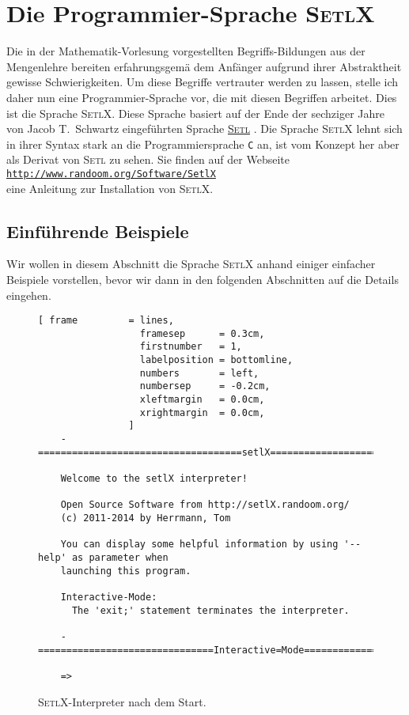 \chapter{Die Programmier-Sprache \textsc{SetlX}}
Die in der Mathematik-Vorlesung vorgestellten Begriffs-Bildungen aus der Mengenlehre bereiten
erfahrungsgem\"{a}\3 dem Anf\"{a}nger aufgrund ihrer Abstraktheit gewisse Schwierigkeiten.  Um
diese Begriffe vertrauter werden zu lassen, stelle ich daher nun eine Programmier-Sprache
vor, die mit diesen Begriffen arbeitet.  Dies ist die Sprache \textsc{SetlX}.
Diese Sprache basiert auf der Ende der sechziger Jahre von Jacob T.~Schwartz eingef\"{u}hrten
Sprache \href{http://en.wikipedia.org/wiki/SETL}{\textsc{Setl}} \cite{setl86}.  
Die Sprache \textsc{SetlX} lehnt sich in ihrer Syntax stark an die Programmiersprache \texttt{C} an,
ist vom Konzept her aber als Derivat von \textsc{Setl} zu sehen. Sie finden auf der Webseite 
\\[0.2cm]
\hspace*{1.3cm}
\href{http://www.randoom.org/Software/SetlX}{\texttt{http://www.randoom.org/Software/SetlX}}
\\[0.2cm]
eine Anleitung zur Installation von \textsc{SetlX}.

\section{Einf\"{u}hrende Beispiele}
Wir wollen in diesem Abschnitt die Sprache \textsc{SetlX} anhand einiger einfacher
Beispiele vorstellen, bevor wir dann in den folgenden Abschnitten auf die Details
eingehen.  

\begin{figure}[!ht]
\centering
\begin{Verbatim}[ frame         = lines, 
                  framesep      = 0.3cm, 
                  firstnumber   = 1,
                  labelposition = bottomline,
                  numbers       = left,
                  numbersep     = -0.2cm,
                  xleftmargin   = 0.0cm,
                  xrightmargin  = 0.0cm,
                ]
    -====================================setlX=============================v2.3.2=-
    
    Welcome to the setlX interpreter!
    
    Open Source Software from http://setlX.randoom.org/
    (c) 2011-2014 by Herrmann, Tom
    
    You can display some helpful information by using '--help' as parameter when
    launching this program.
    
    Interactive-Mode:
      The 'exit;' statement terminates the interpreter.
    
    -===============================Interactive=Mode==============================-
    
    => 
\end{Verbatim}
\vspace*{-0.3cm}
\caption{\textsc{SetlX}-Interpreter nach dem Start.}
\label{fig:setlx}
\end{figure}


